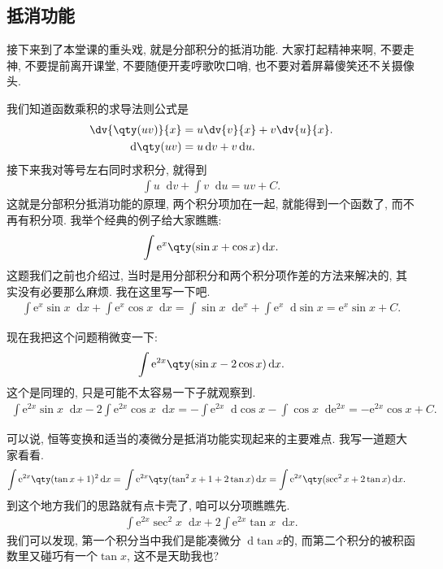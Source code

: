 \documentclass{ctexbook}
\newcommand{\e}{\mathrm{e}}
\newcommand*{\dif}{\mathop{}\!\mathrm{d}}
\begin{document}
{\subsection{抵消功能}
接下来到了本堂课的重头戏, 就是分部积分的抵消功能. 大家打起精神来啊, 不要走神, 不要提前离开课堂, 不要随便开麦哼歌吹口哨, 也不要对着屏幕傻笑还不关摄像头. \par
我们知道函数乘积的求导法则公式是
\begin{align*}
\dv{\qty(uv)}{x}={}&u\dv{v}{x}+v\dv{u}{x}.\\
\dif{\qty(uv)}={}&u\dif{v}+v\dif{u}
.\end{align*}
接下来我对等号左右同时求积分, 就得到
\begin{align*}
\int u\dif{v}+\int v\dif{u}=uv+C
.\end{align*}
这就是分部积分抵消功能的原理, 两个积分项加在一起, 就能得到一个函数了, 而不再有积分项. 我举个经典的例子给大家瞧瞧: 
\begin{align*}
\int\e^{x}\qty(\sin{x}+\cos{x})\dif{x}
.\end{align*}
这题我们之前也介绍过, 当时是用分部积分和两个积分项作差的方法来解决的, 其实没有必要那么麻烦. 我在这里写一下吧. 
\begin{align*}
\int\e^{x}\sin{x}\dif{x}+\int\e^{x}\cos{x}\dif{x}=\int\sin{x}\dif{\e^{x}}+\int\e^{x}\dif{\sin{x}}=\e^{x}\sin{x}+C
.\end{align*}\par
现在我把这个问题稍微变一下: 
\begin{align*}
\int\e^{2x}\qty(\sin{x}-2\cos{x})\dif{x}
.\end{align*}
这个是同理的, 只是可能不太容易一下子就观察到. 
\begin{align*}
\int\e^{2x}\sin{x}\dif{x}-2\int\e^{2x}\cos{x}\dif{x}=-\int\e^{2x}\dif{\cos{x}}-\int\cos{x}\dif{\e^{2x}}=-\e^{2x}\cos{x}+C
.\end{align*}\par
可以说, 恒等变换和适当的凑微分是抵消功能实现起来的主要难点. 我写一道题大家看看. 
\begin{align*}
\int\e^{2x}\qty(\tan{x}+1)^{2}\dif{x}={}&\int\e^{2x}\qty(\tan^{2}{x}+1+2\tan{x})\dif{x}=\int\e^{2x}\qty(\sec^{2}{x}+2\tan{x})\dif{x}
.\end{align*}
到这个地方我们的思路就有点卡壳了, 咱可以分项瞧瞧先. 
\begin{align*}
\int\e^{2x}\sec^{2}{x}\dif{x}+2\int\e^{2x}\tan{x}\dif{x}
.\end{align*}
我们可以发现, 第一个积分当中我们是能凑微分$\dif{\tan{x}}$的, 而第二个积分的被积函数里又碰巧有一个$\tan{x}$, 这不是天助我也? 
}
\end{document}
